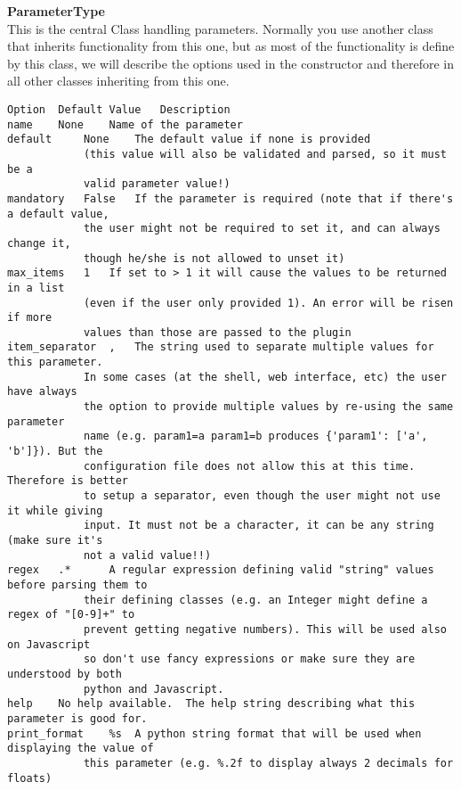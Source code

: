 \documentclass[a4paper,11pt]{ltxdoc}
\begin{document}
\textbf{ParameterType}\\
This is the central Class handling parameters. Normally you use another class that inherits functionality from this one, but as most of the functionality is define by this class, we will describe the options used in the constructor and therefore in all other classes inheriting from this one.\\
\begin{verbatim}
Option 	Default Value 	Description
name 	None 	Name of the parameter
default 	None 	The default value if none is provided 
			(this value will also be validated and parsed, so it must be a 
			valid parameter value!)
mandatory 	False 	If the parameter is required (note that if there's a default value, 
			the user might not be required to set it, and can always change it, 
			though he/she is not allowed to unset it)
max_items 	1 	If set to > 1 it will cause the values to be returned in a list 
			(even if the user only provided 1). An error will be risen if more 
			values than those are passed to the plugin
item_separator 	, 	The string used to separate multiple values for this parameter. 
			In some cases (at the shell, web interface, etc) the user have always 
			the option to provide multiple values by re-using the same parameter 
			name (e.g. param1=a param1=b produces {'param1': ['a', 'b']}). But the 
			configuration file does not allow this at this time. Therefore is better 
			to setup a separator, even though the user might not use it while giving 
			input. It must not be a character, it can be any string (make sure it's 
			not a valid value!!)
regex 	.* 		A regular expression defining valid "string" values before parsing them to 
			their defining classes (e.g. an Integer might define a regex of "[0-9]+" to 
			prevent getting negative numbers). This will be used also on Javascript 
			so don't use fancy expressions or make sure they are understood by both 
			python and Javascript.
help 	No help available. 	The help string describing what this parameter is good for.
print_format 	%s 	A python string format that will be used when displaying the value of 
			this parameter (e.g. %.2f to display always 2 decimals for floats)
\end{verbatim}
\end{document}
